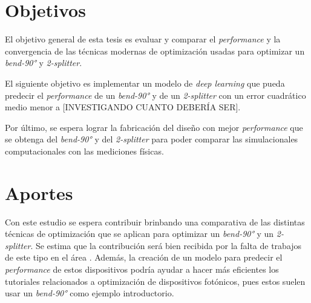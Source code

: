 \section{Objetivos}

El objetivo general de esta tesis es evaluar y comparar el \emph{performance} y la convergencia de las técnicas modernas de optimización usadas para optimizar un \emph{bend-90°} y \emph{2-splitter}.

El siguiente objetivo es implementar un modelo de \emph{deep learning} que pueda predecir el \emph{performance} de un \emph{bend-90°} y de un \emph{2-splitter} con un error cuadrático medio menor a [INVESTIGANDO CUANTO DEBERÍA SER]. 

Por último, se espera lograr la fabricación del diseño con mejor \emph{performance} que se obtenga del \emph{bend-90°} y del \emph{2-splitter} para poder comparar las simulacionales computacionales con las mediciones físicas.

\section{Aportes}

Con este estudio se espera contribuir brinbando una comparativa de las distintas técnicas de optimización que se aplican para optimizar un \emph{bend-90°} y un \emph{2-splitter}. 
Se estima que la contribución será bien recibida por la falta de trabajos de este tipo en el área \cite{Schneider2019, Elsawy2020}.
Además, la creación de un modelo para predecir el \emph{performance} de estos dispositivos podría ayudar a hacer más eficientes los tutoriales
relacionados a optimización de dispositivos fotónicos, pues estos suelen usar un \emph{bend-90°} como ejemplo introductorio.

